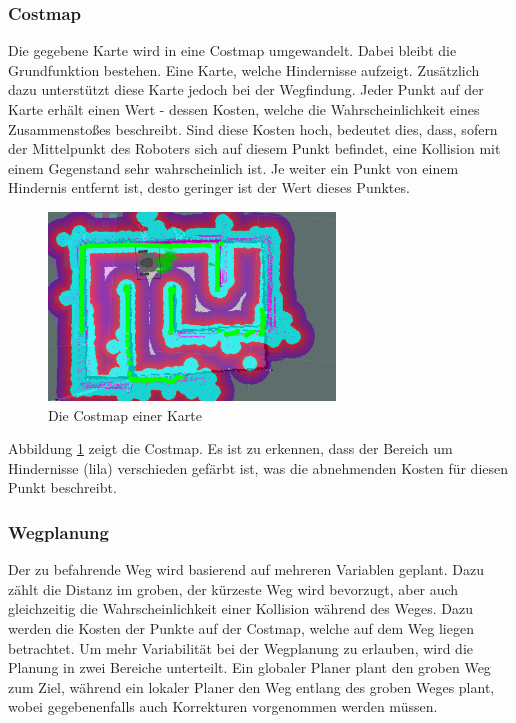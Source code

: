 {{{{			\subsubsection{Costmap}
			{
				Die gegebene Karte wird in eine Costmap umgewandelt. Dabei bleibt die Grundfunktion bestehen. Eine Karte, welche Hindernisse aufzeigt. Zusätzlich dazu unterstützt diese Karte jedoch bei der Wegfindung. Jeder Punkt auf der Karte erhält einen Wert - dessen Kosten, welche die Wahrscheinlichkeit eines Zusammenstoßes beschreibt. Sind diese Kosten hoch, bedeutet dies, dass, sofern der Mittelpunkt des Roboters sich auf diesem Punkt befindet, eine Kollision mit einem Gegenstand sehr wahrscheinlich ist. Je weiter ein Punkt von einem Hindernis entfernt ist, desto geringer ist der Wert dieses Punktes. 
				\begin{figure}[H]
					\centering				\includegraphics[height=5cm]{Bilder/costmap_overlayed.png}
					\caption{Die Costmap einer Karte} 
					\label{pic:costmapoverlayed}
				\end{figure}
				Abbildung \ref{pic:costmapoverlayed} zeigt die Costmap. Es ist zu erkennen, dass der Bereich um Hindernisse (lila) verschieden gefärbt ist, was die abnehmenden Kosten für diesen Punkt beschreibt.
			}
			
			\subsubsection{Wegplanung}
			{
				Der zu befahrende Weg wird basierend auf mehreren Variablen geplant. Dazu zählt die Distanz im groben, \dahe der kürzeste Weg wird bevorzugt, aber auch gleichzeitig die Wahrscheinlichkeit einer Kollision während des Weges. Dazu werden die Kosten der Punkte auf der Costmap, welche auf dem Weg liegen betrachtet. Um mehr Variabilität bei der Wegplanung zu erlauben, wird die Planung in zwei Bereiche unterteilt. Ein globaler Planer plant den groben Weg zum Ziel, während ein lokaler Planer den Weg entlang des groben Weges plant, wobei gegebenenfalls auch Korrekturen vorgenommen werden müssen.
				
}}}}}
